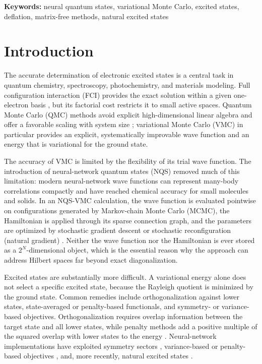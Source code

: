 \documentclass[11pt,a4paper]{article}
\begin{document}
\noindent\textbf{Keywords:} neural quantum states, variational Monte Carlo, excited states, deflation, matrix-free methods, natural excited states

\section{Introduction}

The accurate determination of electronic excited states is a central task in quantum chemistry, spectroscopy, photochemistry, and materials modeling. Full configuration interaction (FCI) provides the exact solution within a given one-electron basis \citep{knowles1984}, but its factorial cost restricts it to small active spaces. Quantum Monte Carlo (QMC) methods avoid explicit high-dimensional linear algebra and offer a favorable scaling with system size \citep{foulkes2001,becca2017}; variational Monte Carlo (VMC) in particular provides an explicit, systematically improvable wave function and an energy that is variational for the ground state.

The accuracy of VMC is limited by the flexibility of its trial wave function. The introduction of neural-network quantum states (NQS) \citep{carleo2017} removed much of this limitation: modern neural-network wave functions can represent many-body correlations compactly and have reached chemical accuracy for small molecules and solids. In an NQS-VMC calculation, the wave function is evaluated pointwise on configurations generated by Markov-chain Monte Carlo (MCMC), the Hamiltonian is applied through its sparse connection graph, and the parameters are optimized by stochastic gradient descent or stochastic reconfiguration (natural gradient) \citep{becca2017,vicentini2022}. Neither the wave function nor the Hamiltonian is ever stored as a $2^N$-dimensional object, which is the essential reason why the approach can address Hilbert spaces far beyond exact diagonalization.

Excited states are substantially more difficult. A variational energy alone does not select a specific excited state, because the Rayleigh quotient is minimized by the ground state. Common remedies include orthogonalization against lower states, state-averaged or penalty-based functionals, and symmetry- or variance-based objectives. Orthogonalization requires overlap information between the target state and all lower states, while penalty methods add a positive multiple of the squared overlap with lower states to the energy \citep{zhao2020}. Neural-network implementations have exploited symmetry sectors \citep{choo2018}, variance-based or penalty-based objectives \citep{entwistle2023}, and, more recently, natural excited states \citep{pfau2024}.
\end{document}
